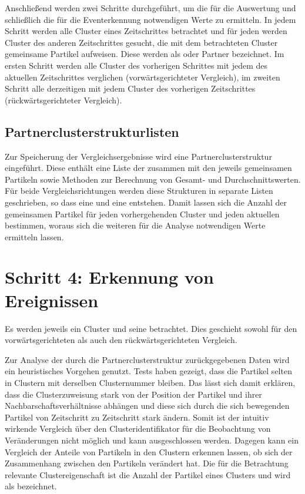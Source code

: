 Anschließend werden zwei Schritte durchgeführt, um die für die Auswertung und schließlich die für die Eventerkennung notwendigen Werte zu ermitteln. In jedem Schritt werden alle Cluster eines Zeitschrittes betrachtet und für jeden werden Cluster des anderen Zeitschrittes gesucht, die mit dem betrachteten Cluster gemeinsame Partikel aufweisen. Diese werden als  oder Partner bezeichnet. Im ersten Schritt werden alle Cluster des vorherigen Schrittes mit jedem des aktuellen Zeitschrittes verglichen (vorwärtsgerichteter Vergleich), im zweiten Schritt alle derzeitigen mit jedem Cluster des vorherigen Zeitschrittes (rückwärtsgerichteter Vergleich). 

\subsection*{Partnerclusterstrukturlisten}\label{sec:partnerclusterstrukturlisten}
Zur Speicherung der Vergleichsergebnisse wird eine Partnerclusterstruktur eingeführt. Diese enthält eine Liste der  zusammen mit den jeweils gemeinsamen Partikeln sowie Methoden zur Berechnung von Gesamt- und Durchschnittswerten. Für beide Vergleichsrichtungen werden diese Strukturen in separate Listen geschrieben, so dass eine  und eine  entstehen. Damit lassen sich die Anzahl der gemeinsamen Partikel für jeden vorhergehenden Cluster und jeden aktuellen bestimmen, woraus sich die weiteren für die Analyse notwendigen Werte ermitteln lassen.

\section{Schritt 4: Erkennung von Ereignissen}\label{sec:ereigniserkennung}

Es werden jeweils ein Cluster und seine  betrachtet. Dies geschieht sowohl für den vorwärtsgerichteten als auch den rückwärtsgerichteten Vergleich.

Zur Analyse der durch die Partnerclusterstruktur zurückgegebenen Daten wird ein heuristisches Vorgehen genutzt. Tests haben gezeigt, dass die Partikel selten in Clustern mit derselben Clusternummer bleiben. Das lässt sich damit erklären, dass die Clusterzuweisung stark von der Position der Partikel und ihrer Nachbarschaftsverhältnisse abhängen und diese sich durch die sich bewegenden Partikel von Zeitschritt zu Zeitschritt stark ändern. Somit ist der intuitiv wirkende Vergleich über den Clusteridentifikator für die Beobachtung von Veränderungen nicht möglich und kann ausgeschlossen werden. %
Dagegen kann ein Vergleich der Anteile von Partikeln in den Clustern erkennen lassen, ob sich der Zusammenhang zwischen den Partikeln verändert hat. Die für die Betrachtung relevante Clustereigenschaft ist die Anzahl der Partikel eines Clusters und wird als  bezeichnet.

